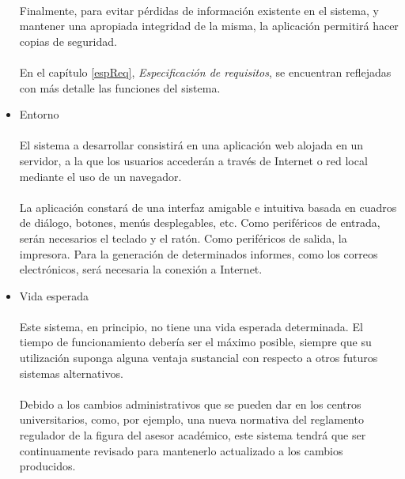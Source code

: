 \begin{itemize}
   \paragraph{}Finalmente, para evitar pérdidas de información existente
   en el sistema, y mantener una apropiada integridad de la misma, la aplicación
   permitirá hacer copias de seguridad.

   \paragraph{}En el capítulo \ref{espReq}, \textit{Especificación de
   requisitos}, se encuentran reflejadas con más detalle las funciones del
   sistema.

 \item Entorno

   \paragraph{}El sistema a desarrollar consistirá en una aplicación web alojada
   en un servidor, a la que los usuarios accederán a través de Internet o red
   local mediante el uso de un navegador.

   \paragraph{}La aplicación constará de una interfaz amigable e
   intuitiva basada en cuadros de diálogo, botones, menús desplegables, etc.
   Como periféricos de entrada, serán necesarios el teclado y el ratón. Como
   periféricos de salida, la impresora. Para la generación de determinados
   informes, como los correos electrónicos, será necesaria la conexión a
   Internet.

 \item Vida esperada

   \paragraph{}Este sistema, en principio, no tiene una vida esperada
   determinada. El tiempo de funcionamiento debería ser el máximo posible,
   siempre que su utilización suponga alguna ventaja sustancial con respecto a
   otros futuros sistemas alternativos.

   \paragraph{}Debido a los cambios administrativos que se pueden dar en los
   centros universitarios, como, por ejemplo, una nueva normativa del reglamento
   regulador de la figura del asesor académico, este sistema tendrá que ser
   continuamente revisado para mantenerlo actualizado a los cambios producidos.


\end{itemize}
